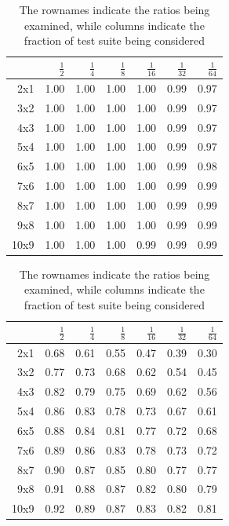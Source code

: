 \documentclass[conference]{IEEEtran}
\begin{document}
\begin{table}
\centering
\caption{Regression results $M_2\times M_1$ for $\frac{1}{2^n}$ test suites -- Apache commons-math}
\caption*{$R^2$}
{\small
\begin{tabular}{rrrrrrr}
  \hline
 & $\frac{1}{2}$ & $\frac{1}{4}$ & $\frac{1}{8}$ & $\frac{1}{16}$ & $\frac{1}{32}$ & $\frac{1}{64}$ \\ 
  \hline
2x1 & 1.00 & 1.00 & 1.00 & 1.00 & 0.99 & 0.97 \\ 
  3x2 & 1.00 & 1.00 & 1.00 & 1.00 & 0.99 & 0.97 \\ 
  4x3 & 1.00 & 1.00 & 1.00 & 1.00 & 0.99 & 0.97 \\ 
  5x4 & 1.00 & 1.00 & 1.00 & 1.00 & 0.99 & 0.97 \\ 
  6x5 & 1.00 & 1.00 & 1.00 & 1.00 & 0.99 & 0.98 \\ 
  7x6 & 1.00 & 1.00 & 1.00 & 1.00 & 0.99 & 0.99 \\ 
  8x7 & 1.00 & 1.00 & 1.00 & 1.00 & 0.99 & 0.99 \\ 
  9x8 & 1.00 & 1.00 & 1.00 & 1.00 & 0.99 & 0.99 \\ 
  10x9 & 1.00 & 1.00 & 1.00 & 0.99 & 0.99 & 0.99 \\ 
   \hline
\end{tabular}
}


\caption*{Estimate}
{\small
\begin{tabular}{rrrrrrr}
  \hline
 & $\frac{1}{2}$ & $\frac{1}{4}$ & $\frac{1}{8}$ & $\frac{1}{16}$ & $\frac{1}{32}$ & $\frac{1}{64}$ \\ 
  \hline
2x1 & 0.68 & 0.61 & 0.55 & 0.47 & 0.39 & 0.30 \\ 
  3x2 & 0.77 & 0.73 & 0.68 & 0.62 & 0.54 & 0.45 \\ 
  4x3 & 0.82 & 0.79 & 0.75 & 0.69 & 0.62 & 0.56 \\ 
  5x4 & 0.86 & 0.83 & 0.78 & 0.73 & 0.67 & 0.61 \\ 
  6x5 & 0.88 & 0.84 & 0.81 & 0.77 & 0.72 & 0.68 \\ 
  7x6 & 0.89 & 0.86 & 0.83 & 0.78 & 0.73 & 0.72 \\ 
  8x7 & 0.90 & 0.87 & 0.85 & 0.80 & 0.77 & 0.77 \\ 
  9x8 & 0.91 & 0.88 & 0.87 & 0.82 & 0.80 & 0.79 \\ 
  10x9 & 0.92 & 0.89 & 0.87 & 0.83 & 0.82 & 0.81 \\ 
   \hline
\end{tabular}
}


\caption*{The rownames indicate the ratios being examined, while columns indicate the fraction of test suite being considered}
\label{tbl:amkilln}
\end{table}
\end{document}
